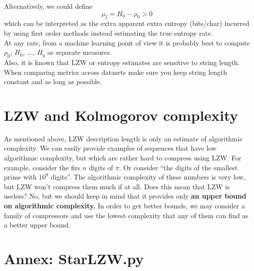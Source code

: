 \documentclass[11pt]{amsart}
\begin{document}
Alternatively, we could define
$$
\rho_{2}= H_{0} -  \rho_{0} >0
$$
which can be interpreted as the extra apparent extra entropy (bits/char) incurred by using first order methods instead estimating the true entropy rate. \\

At any rate, from a machine learning point of view it is probably best to compute $\rho_{0}$, $H_{0}$, ..., $H_{q}$ as separate measures.
\\

Also, it is known that LZW or entropy estimates are sensitive to string length. When comparing metrics across datasets make sure you keep string length constant and as long as possible.


\section{LZW and Kolmogorov complexity}
As mentioned above, LZW description length is only an estimate of algorithmic complexity. We can easily provide examples of sequences that have low algorithmic complexity, but which are rather hard to compress using LZW. For example, consider the firs $n$ digits of $\pi$. Or consider ``the digits of the smallest prime with $10^9$ digits''. The algorithmic complexity of these numbers is very low, but LZW won't compress them much if at all. Does this mean that LZW is useless? No, but we should keep in mind that it provides only {\bf an upper bound on algorithmic complexity.} In order to get better bounds, we may consider a family of compressors and use the lowest complexity that any of them can find as a better upper bound. %

\footnotesize
% 
 
\clearpage

 


{\scriptsize
\section*{Annex: StarLZW.py}

}
\end{document}
